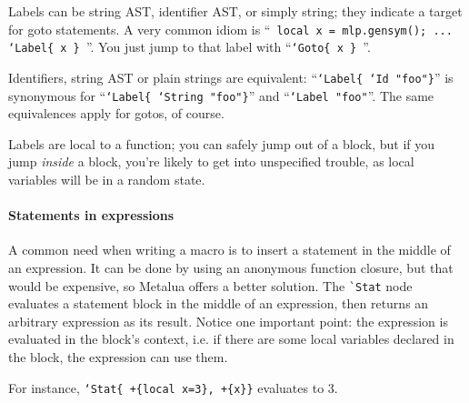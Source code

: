 Labels can be string AST, identifier AST, or simply string; they
indicate a target for goto statements.  A very common idiom is ``{\tt
  local x = mlp.gensym(); ... `Label\{ x \} }''. You just jump to that
label with ``{\tt `Goto\{ x \} }''.

Identifiers, string AST or plain strings are equivalent: 
``{\tt`Label\{ `Id "foo"\}}'' is synonymous for ``{\tt`Label\{ `String
  "foo"\}}'' and ``{\tt`Label "foo"}''. The same equivalences apply
for gotos, of course.

Labels are local to a function; you can safely jump out of a block,
but if you jump {\em inside} a block, you're likely to get into unspecified
trouble, as local variables will be in a random state.

\paragraph{Statements in expressions}
A common need when writing a macro is to insert a statement in the
middle of an expression. It can be done by using an anonymous function
closure, but that would be expensive, so Metalua offers a better
solution. The \verb|`Stat| node evaluates a statement block in the
middle of an expression, then returns an arbitrary expression as its
result. Notice one important point: the expression is evaluated in
the block's context, i.e. if there are some local variables declared
in the block, the expression can use them.

For instance, {\tt `Stat\{ +\{local x=3\}, +\{x\}\}} evaluates to 3.



